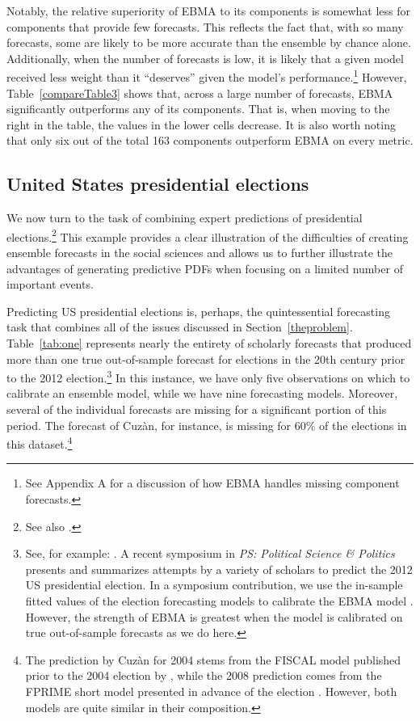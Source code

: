 \documentclass[12pt,fullpage,endnotes]{article}
\begin{document}
Notably, the relative superiority of EBMA to its components is
somewhat less for components that provide few forecasts.  This
reflects the fact that, with so many forecasts, some are likely to be
more accurate than the ensemble by chance alone. Additionally, when
the number of forecasts is low, it is likely that a given model
received less weight than it ``deserves'' given the model's
performance.\footnote{See Appendix A for a discussion of how EBMA
  handles missing component forecasts.} However,
Table~\ref{compareTable3} shows that, across a large number of
forecasts, EBMA significantly outperforms any of its components.  That
is, when moving to the right in the table, the values in the lower
cells decrease. It is also worth noting that only six out of the total
163 components outperform EBMA on every metric.

\subsection{United States presidential elections}

We now turn to the task of combining expert predictions of
 presidential elections.\footnote{See also
  \citet{Montgomery:2012c}.}  This example provides a clear
illustration of the difficulties of creating ensemble forecasts in the
social sciences and allows us to further illustrate the advantages of
generating predictive PDFs when focusing on a limited number of
important events.

Predicting US presidential elections is, perhaps, the quintessential
forecasting task that combines all of the issues discussed in
Section~\ref{theproblem}.  Table~\ref{tab:one} represents nearly the
entirety of scholarly forecasts that produced more than one true
out-of-sample forecast for elections in the 20th century prior to the
2012 election.\footnote{ See, for example: \citet[][]{Fair:2009,
    Fair2011, Abramowitz:2008, Campbell:2008,
    Cuzan:2004,Cuzan:Bundrick:2008,hibbs:2012, Lockerbie:2008,
    Erikson:Wlezien:2008, Graefe:2010, Holbrook:2008}.  A recent
  symposium in {\em PS: Political Science \& Politics} presents and
  summarizes attempts by a variety of scholars to predict the 2012
  US presidential election. In a symposium contribution, we use the
  in-sample fitted values of the election forecasting models to
  calibrate the EBMA model \citep{Montgomery:2012c}. However, the
  strength of EBMA is greatest when the model is calibrated on true
  out-of-sample forecasts as we do here.}  In this instance, we have
only five observations on which to calibrate an ensemble model, while
we have nine forecasting models.  Moreover, several of the individual
forecasts are missing for a significant portion of this period.  The
forecast of Cuz\`an, for instance, is missing for 60\% of the
elections in this dataset.\footnote{The prediction by Cuz\`an for
  2004 stems from the FISCAL model published prior to the 2004
  election by \citet{Cuzan:2004}, while the 2008 prediction comes from
  the FPRIME short model presented in advance of the election
  \citep{Cuzan:Bundrick:2008}. However, both models are quite similar
  in their composition.}
\end{document}
